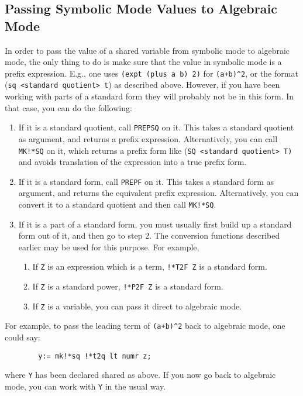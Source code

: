\subsection{Passing Symbolic Mode Values to Algebraic Mode}

In order to pass the value of a shared variable from symbolic mode to
algebraic mode, the only thing to do is make sure that the value in
symbolic mode is a prefix expression. E.g., one uses
{\tt (expt (plus a b) 2)} for {\tt (a+b)\^{ }2}, or the format ({\tt *sq
<standard quotient> t}) as described above.  However, if you have
been working with parts of a standard form they will probably not be in
this form.  In that case, you can do the following:
\begin{enumerate}
\item If it is a standard quotient, call {\tt PREPSQ} on it.  This takes a
standard quotient as argument, and returns a prefix expression.
Alternatively, you can call {\tt MK!*SQ} on it, which returns a prefix
form like ({\tt *SQ <standard quotient> T)} and avoids translation of
the expression into a true prefix form.

\item If it is a standard form, call {\tt PREPF} on it.  This takes a
standard form as argument, and returns the equivalent prefix expression.
Alternatively, you can convert it to a standard quotient and then call
{\tt MK!*SQ}.

\item If it is a part of a standard form, you must usually first build up a
standard form out of it, and then go to step 2. The conversion functions
described earlier may be used for this purpose. For example,
\begin{enumerate}
\item If {\tt Z} is an expression which is a term, {\tt !*T2F Z} is a
standard form.
\item If {\tt Z} is a standard power, {\tt !*P2F Z} is a standard form.
\item If {\tt Z} is a variable, you can pass it direct to algebraic mode.
\end{enumerate}
\end{enumerate}
For example, to pass the leading term of {\tt (a+b)\^{ }2} back to
algebraic mode, one could say:
\begin{verbatim}
        y:= mk!*sq !*t2q lt numr z;
\end{verbatim}
where {\tt Y} has been declared shared as above.  If you now go back to
algebraic mode, you can work with {\tt Y} in the usual way.


